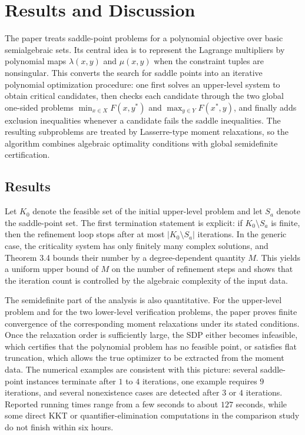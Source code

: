 \documentclass[11pt]{article}
\begin{document}
\section{Results and Discussion}
The paper treats saddle-point problems for a polynomial objective over basic semialgebraic sets.
Its central idea is to represent the Lagrange multipliers by polynomial maps $\lambda(x,y)$ and
$\mu(x,y)$ when the constraint tuples are nonsingular. This converts the search for saddle points
into an iterative polynomial optimization procedure: one first solves an upper-level system to obtain
critical candidates, then checks each candidate through the two global one-sided problems
$\min_{x\in X}F(x,y^\ast)$ and $\max_{y\in Y}F(x^\ast,y)$, and finally adds exclusion inequalities
whenever a candidate fails the saddle inequalities. The resulting subproblems are treated by
Lasserre-type moment relaxations, so the algorithm combines algebraic optimality conditions with
global semidefinite certification.

\subsection{Results}
Let $K_0$ denote the feasible set of the initial upper-level problem and let $S_a$ denote the
saddle-point set. The first termination statement is explicit: if $K_0\setminus S_a$ is finite, then
the refinement loop stops after at most $|K_0\setminus S_a|$ iterations. In the generic case, the
criticality system has only finitely many complex solutions, and Theorem 3.4 bounds their number by
a degree-dependent quantity $M$. This yields a uniform upper bound of $M$ on the number of
refinement steps and shows that the iteration count is controlled by the algebraic complexity of the
input data.

The semidefinite part of the analysis is also quantitative. For the upper-level problem and for the
two lower-level verification problems, the paper proves finite convergence of the corresponding
moment relaxations under its stated conditions. Once the relaxation order is sufficiently large, the
SDP either becomes infeasible, which certifies that the polynomial problem has no feasible point, or
satisfies flat truncation, which allows the true optimizer to be extracted from the moment data. The
numerical examples are consistent with this picture: several saddle-point instances terminate after
$1$ to $4$ iterations, one example requires $9$ iterations, and several nonexistence cases are
detected after $3$ or $4$ iterations. Reported running times range from a few seconds to about
$127$ seconds, while some direct KKT or quantifier-elimination computations in the comparison study
do not finish within six hours.
\end{document}
